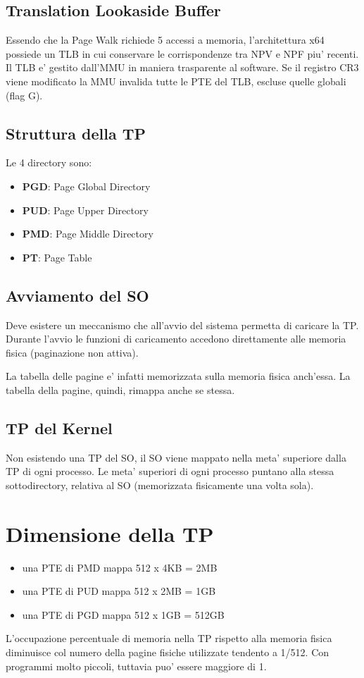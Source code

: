 \documentclass[12pt, a4paper]{report}
\begin{document}
\subsection{Translation Lookaside Buffer}
Essendo che la Page Walk richiede 5 accessi a memoria, l'architettura x64
possiede un TLB in cui conservare le corrispondenze tra NPV e NPF piu'
recenti. Il TLB e' gestito dall'MMU in maniera trasparente al software.
Se il registro CR3 viene modificato la MMU invalida tutte le PTE del TLB,
escluse quelle globali (flag G).
\subsection{Struttura della TP}
Le 4 directory sono:
\begin{itemize}
	\item \textbf{PGD}: Page Global Directory
	\item \textbf{PUD}: Page Upper Directory
	\item \textbf{PMD}: Page Middle Directory
	\item \textbf{PT}: Page Table
\end{itemize}
\subsection{Avviamento del SO}
Deve esistere un meccanismo che all'avvio del sistema permetta di caricare la
TP. Durante l'avvio le funzioni di caricamento accedono direttamente alle
memoria fisica (paginazione non attiva).

La tabella delle pagine e' infatti memorizzata sulla memoria fisica anch'essa.
La tabella della pagine, quindi, rimappa anche se stessa.
\subsection{TP del Kernel}
Non esistendo una TP del SO, il SO viene mappato nella meta' superiore dalla TP
di ogni processo. Le meta' superiori di ogni processo puntano alla stessa
sottodirectory, relativa al SO (memorizzata fisicamente una volta sola).

\section{Dimensione della TP}
\begin{itemize}
	\item una PTE di PMD mappa 512 x 4KB = 2MB
	\item una PTE di PUD mappa 512 x 2MB = 1GB
	\item una PTE di PGD mappa 512 x 1GB = 512GB
\end{itemize}
L'occupazione percentuale di memoria nella TP rispetto alla memoria fisica
diminuisce col numero della pagine fisiche utilizzate tendento a 1/512. Con
programmi molto piccoli, tuttavia puo' essere maggiore di 1.
\end{document}
